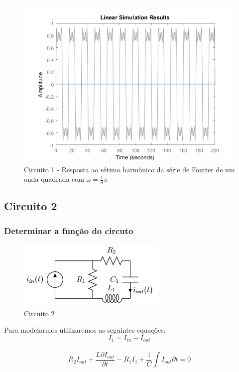 \documentclass[a4paper, 12pt]{article}
\begin{document}
			\begin{figure}[!ht]
				\centering
				\includegraphics[scale=0.71]{img/1m_circ1.png}
				\caption{Circuito 1 - Resposta ao sétimo harmônico da série de Fourier de um onda quadrada com $\omega = \frac{1}{8}\pi$}
			\end{figure}
		\newpage
		\subsection{Circuito 2}
			\subsubsection{Determinar a função do circuto}
			\begin{figure}[!hb]
				\centering
				\includegraphics{img/circuito2.png}
				\caption{Circuito 2}
			\end{figure}

			Para modelarmos utilizaremos as seguintes equações:
			\[
				 I_{1} = I_{in} - I_{out}
			\] 	\\
			\[
				 R_{2}I_{out} + \frac{L \partial I_{out}}{\partial t} - R_{1}I_{1} + \frac{1}{C}\int I_{out}\partial t = 0
			\] 	\\
\end{document}
